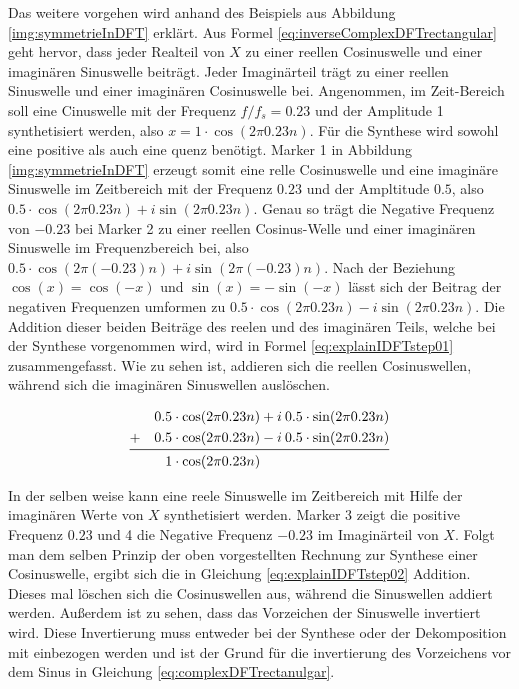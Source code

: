 Das weitere vorgehen wird anhand des Beispiels aus Abbildung \ref{img:symmetrieInDFT}  erklärt. Aus Formel \ref{eq:inverseComplexDFTrectangular} geht  hervor, dass jeder Realteil von $X$ zu einer reellen Cosinuswelle und einer imaginären Sinuswelle beiträgt. Jeder Imaginärteil trägt zu einer reellen Sinuswelle und einer imaginären Cosinuswelle bei. Angenommen, im Zeit-Bereich soll eine Cinuswelle mit der Frequenz $f/f_s = 0.23$ und der Amplitude 1 synthetisiert werden, also $ x = 1 \cdot \cos(2  \pi 0.23 n)$. Für die Synthese wird sowohl eine positive als auch eine quenz benötigt. Marker 1 in Abbildung \ref{img:symmetrieInDFT} erzeugt somit eine relle Cosinuswelle und eine imaginäre Sinuswelle im Zeitbereich mit der Frequenz $0.23$ und der Ampltitude $0.5$, also $0.5 \cdot \cos(2  \pi 0.23 n) + i \sin(2  \pi 0.23 n)$. Genau so trägt die Negative Frequenz von $-0.23$ bei Marker 2 zu einer reellen Cosinus-Welle und einer imaginären Sinuswelle im Frequenzbereich bei, also $0.5 \cdot \cos(2  \pi (-0.23) n) + i \sin(2  \pi (-0.23) n)$. Nach der Beziehung $\cos(x) = \cos(-x) $ und $\sin(x) = -\sin(-x) $ lässt sich der Beitrag der negativen Frequenzen umformen zu $0.5 \cdot \cos(2  \pi 0.23 n) - i \sin(2  \pi 0.23 n)$. Die Addition dieser beiden Beiträge des reelen und des imaginären Teils, welche bei der Synthese vorgenommen wird, wird in Formel \ref{eq:explainIDFTstep01} zusammengefasst. Wie zu sehen ist, addieren sich die reellen Cosinuswellen, während sich die imaginären  Sinuswellen auslöschen. \cite[S. 573- 574]{dspGuide}

\begin{equation}
\begin{split}
0.5 \cdot \cos(2  \pi 0.23 n) + i \: 0.5 \cdot \sin(2  \pi 0.23 n) \\
+ \quad 0.5 \cdot \cos(2  \pi 0.23 n) - i \:  0.5 \cdot \sin(2  \pi 0.23 n) \\
\midrule
1 \cdot  \cos(2  \pi 0.23 n) \qquad \qquad \qquad \qquad \quad \;
\end{split}
\label{eq:explainIDFTstep01}
\end{equation}
 
 In der selben weise kann eine reele Sinuswelle im Zeitbereich mit Hilfe der imaginären Werte von $X$ synthetisiert werden. Marker 3 zeigt die positive Frequenz $0.23$ und 4 die Negative Frequenz $-0.23$ im Imaginärteil von $X$. Folgt man dem selben Prinzip der oben vorgestellten Rechnung zur Synthese einer Cosinuswelle, ergibt sich die in Gleichung \ref{eq:explainIDFTstep02} Addition. Dieses mal löschen sich die Cosinuswellen aus, während die Sinuswellen addiert werden. Außerdem ist zu sehen, dass das Vorzeichen der Sinuswelle invertiert wird.  Diese Invertierung muss entweder bei der Synthese oder der Dekomposition mit einbezogen werden und ist der Grund für die invertierung des Vorzeichens vor dem Sinus in Gleichung \ref{eq:complexDFTrectanulgar}. \cite[S. 574]{dspGuide} 
 
